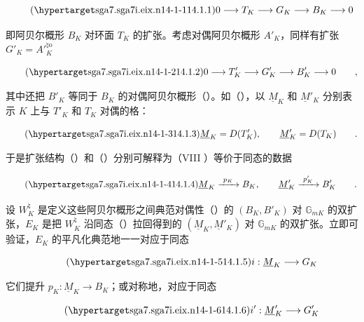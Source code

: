 \begin{equation}\tag{\SGARefTarget{sga7.sga7i.eix.n14-1-1}{14.1.1}}
 0\longrightarrow T_K\longrightarrow G_K\longrightarrow B_K
 \longrightarrow0
\end{equation}

\noindent
即阿贝尔概形 $B_K$ 对环面 $T_K$ 的扩张。考虑对偶阿贝尔概形 $A'_K$，同样有扩张 $G'_K=A'{}^{\natural\mathrm o}_K$

\begin{equation}\tag{\SGARefTarget{sga7.sga7i.eix.n14-1-2}{14.1.2}}
 0\longrightarrow T'_K\longrightarrow G'_K\longrightarrow B'_K
 \longrightarrow0\qquad ,
\end{equation}

\noindent
其中还把 $B'_K$ 等同于 $B_K$ 的对偶阿贝尔概形（）。如（），以 $\underline M_K$ 和 $\underline M'_K$ 分别表示 $K$ 上与 $T'_K$ 和 $T_K$ 对偶的格：

\begin{equation}\tag{\SGARefTarget{sga7.sga7i.eix.n14-1-3}{14.1.3}}
 \underline M_K=D(T'_K),\qquad \underline M'_K=D(T_K)\qquad .
\end{equation}

\noindent
于是扩张结构（）和（）分别可解释为（VIII ）等价于同态的数据

\begin{equation}\tag{\SGARefTarget{sga7.sga7i.eix.n14-1-4}{14.1.4}}
 \underline M_K\xrightarrow{\ p_K\ }B_K,\qquad
 \underline M'_K\xrightarrow{\ p'_K\ }B'_K\qquad .
\end{equation}

设 $W_K^{\natural}$ 是定义这些阿贝尔概形之间典范对偶性（）的 $(B_K,B'_K)$ 对 $\mathbb G_{mK}$ 的双扩张，$E_K$ 是把 $W_K^{\natural}$ 沿同态（）拉回得到的 $(\underline M_K,\underline M'_K)$ 对 $\mathbb G_{mK}$ 的双扩张。立即可验证，$E_K$ 的平凡化典范地一一对应于同态

\begin{equation}\tag{\SGARefTarget{sga7.sga7i.eix.n14-1-5}{14.1.5}}
 i:\underline M_K\longrightarrow G_K
\end{equation}

\noindent
它们提升 $p_K:\underline M_K\longrightarrow B_K$；或对称地，对应于同态

\begin{equation}\tag{\SGARefTarget{sga7.sga7i.eix.n14-1-6}{14.1.6}}
 i':\underline M'_K\longrightarrow G'_K
\end{equation}

